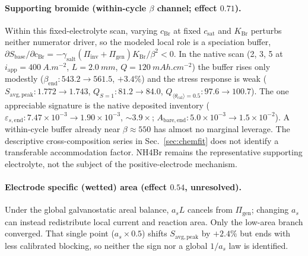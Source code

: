 \documentclass[11pt]{article}
\newcommand{\iapp}{i_{\mathrm{app}}}
\newcommand{\csat}{c_{\mathrm{sat}}}
\newcommand{\thetacal}{\theta_{\mathrm{cal}}}
\newcommand{\mAhcm}{\si{mAh.cm^{-2}}}
\begin{document}
\paragraph{Supporting bromide (within-cycle $\beta$ channel; effect $0.71$).} Within this fixed-electrolyte
scan, varying $c_{\mathrm{Br}}$ at fixed $\csat$ and $K_{\mathrm{Br}}$ perturbs neither numerator driver, so
the modeled local role is a speciation buffer,
$\partial S_{\mathrm{base}}/\partial c_{\mathrm{Br}}=-\gamma_{\mathrm{salt}}
(\Pi_{\mathrm{inv}}+\Pi_{\mathrm{gen}})K_{\mathrm{Br}}/\beta^2<0$.
In the native scan (\SI{2}{\Molar}, \SI{3}{\Molar}, \SI{5}{\Molar} at $\iapp=\SI{400}{A.m^{-2}}$,
$L=\SI{2.0}{mm}$, $Q=\SI{120}{\mAhcm}$) the buffer rises only modestly ($\beta_{\mathrm{end}}:543.2\to561.5$,
$+3.4\%$) and the stress response is weak ($S_{\mathrm{avg,peak}}:1.772\to1.743$, $Q_{S=1}:81.2\to84.0$,
$Q_{\langle\thetacal\rangle=0.5}:97.6\to100.7$). The one appreciable signature is the native deposited inventory
($\varepsilon_{s,\mathrm{end}}:7.47\times10^{-3}\to1.90\times10^{-3}$, $\sim\!3.9\times$; $A_{\mathrm{bare,end}}:
5.0\times10^{-3}\to1.5\times10^{-2}$). A within-cycle buffer already near $\beta\approx550$ has almost no
marginal leverage. The descriptive cross-composition series in Sec.~\ref{sec:chemfit} does not identify a
transferable accommodation factor. NH4Br remains the representative supporting electrolyte, not the subject
of the positive-electrode mechanism.

\paragraph{Electrode specific (wetted) area (effect $0.54$, unresolved).} Under the global galvanostatic
areal balance, $a_sL$ cancels from $\Pi_{\mathrm{gen}}$; changing $a_s$ can instead redistribute local current
and reaction area. Only the low-area branch converged. That single point ($a_s\!\times\!0.5$) shifts
$S_{\mathrm{avg,peak}}$ by $+2.4\%$ but ends with less calibrated blocking, so neither the sign nor a global
$1/a_s$ law is identified.
\end{document}
